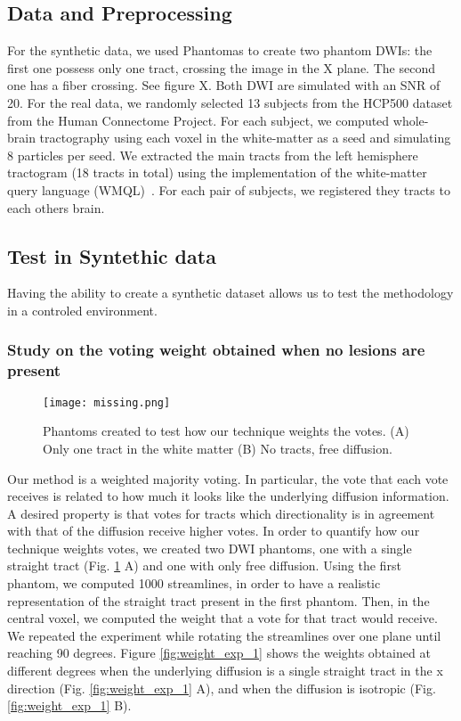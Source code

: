 \subsection{Data and Preprocessing}
For the synthetic data, we used Phantomas to create two phantom DWIs: the
first one possess only one tract, crossing the image in the X plane. The 
second one has a fiber crossing. See figure X. Both DWI are simulated with
an SNR of 20. For the
real data, 
we randomly selected 13 subjects from the HCP500 dataset from the Human
Connectome Project. For each subject, we computed whole-brain tractography
using each voxel in the white-matter as a seed and simulating 8 particles per
seed. We extracted the main tracts from the left
hemisphere tractogram (18 tracts in total) using the implementation of the
white-matter query language (WMQL)~\cite{Wassermann2016}. For each pair of
subjects, we registered they tracts to each others brain.


\subsection{Test in Syntethic data}

Having the ability to create a synthetic dataset allows us to test the
methodology in a controled environment. 



\subsubsection{Study on the voting weight obtained when no lesions are present}

\begin{figure}[h]
    \texttt{[image: missing.png]}
    \caption{Phantoms created to test how our technique weights the votes.
             (A) Only one tract in the white matter (B) No tracts, free diffusion.}
    \label{fig:pha_exp_1}
\end{figure}

Our method is a weighted majority voting. In particular, the vote that each
vote receives is related to how much it looks like the underlying diffusion
information. A desired property is that votes for tracts which directionality
is in agreement with that of the diffusion receive higher votes. In order to
quantify how our technique weights votes, we created two DWI phantoms, one with 
a single straight tract (Fig. \ref{fig:pha_exp_1} A) and one with only free
diffusion. Using the first phantom, we computed 1000 streamlines, in order
to have a realistic representation of the straight tract present in the first
phantom. Then, in the central voxel, we computed the weight that a vote for
that tract would receive. We repeated the experiment while rotating the streamlines
over one plane until reaching 90 degrees. Figure \ref{fig:weight_exp_1} shows
the weights obtained at different degrees when the underlying diffusion is a
single straight tract in the x direction (Fig. \ref{fig:weight_exp_1} A), and
when the diffusion is isotropic (Fig. \ref{fig:weight_exp_1} B).

